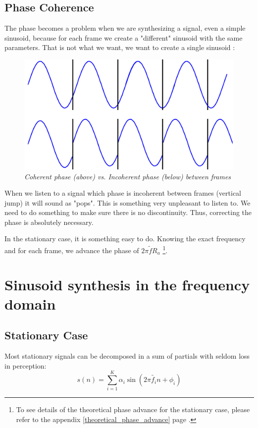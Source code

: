 \documentclass[]{article}
\begin{document}
\subsection{Phase Coherence}\label{phase-coherence}
The phase becomes a problem when we are synthesizing a signal, even a simple sinusoid, because for each frame we create a "different" sinusoid with the same parameters. That is not what we want, we want to create a single sinusoid : 
\begin{figure} [H]
	\centering
	\includegraphics[scale = 0.2]{coherentphase.png}
	\caption {\it Coherent phase (above) vs. Incoherent phase (below) between frames}
\end{figure}
When we listen to a signal which phase is incoherent between frames (vertical jump) it will sound as "pops".  This is something very unpleasant to listen to. We need to do something to make sure there is no discontinuity. Thus, correcting the phase is absolutely necessary. 

In the stationary case, it is something easy to do. Knowing the exact frequency and for each frame, we advance the phase of $2\pi \tilde{f} R_a$  \footnote{To see details of the theoretical phase advance for the stationary case, please refer to the appendix \ref{theoretical_phase_advance} page \pageref{theoretical_phase_advance}.}.
\section{Sinusoid synthesis in the frequency domain}

\subsection{Stationary Case}\label{stationary-case}
Most stationary signals can be decomposed in a sum of partials with seldom loss in perception:
\begin{equation}
s(n) = \sum_{i=1}^{K}\alpha_i \sin(2\pi \tilde{f_i} n + \phi_{i})
\end{equation}
\end{document}
